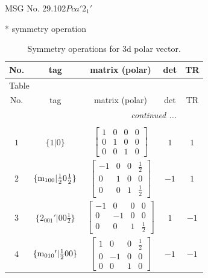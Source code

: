 \documentclass[fleqn,8pt]{jsarticle}
\begin{document}
\setcounter{MaxMatrixCols}{32}

\renewcommand{\tablename}{Table~}
\renewcommand{\figurename}{Figure~}
\begin{center}
\LARGE
MSG No. 29.102\quad$Pca'2_{1}'$
\end{center}
* symmetry operation
\renewcommand{\arraystretch}{1.3}
\begin{longtable}{ccccc}
\caption{Symmetry operations for 3d polar vector.}
 \\
 \hline \hline
No. & tag & matrix (polar) & det & TR \\ \hline \endfirsthead

\multicolumn{4}{l}{\tablename\ \thetable{}} \\
 \hline \hline
No. & tag & matrix (polar) & det & TR \\ \hline \endhead

 \hline \hline
\multicolumn{4}{r}{\footnotesize\it continued ...} \\ \endfoot

 \hline \hline
\multicolumn{4}{r}{} \\ \endlastfoot

$ 1 $ & $ \{1|0\} $ & $ \begin{bmatrix} 1 & 0 & 0 & 0 \\ 0 & 1 & 0 & 0 \\ 0 & 0 & 1 & 0 \end{bmatrix} $ & $ 1 $ & $ 1 $ \\ \hline
$ 2 $ & $ \{{\rm m}_{100}|\frac{1}{2} 0 \frac{1}{2}\} $ & $ \begin{bmatrix} -1 & 0 & 0 & \frac{1}{2} \\ 0 & 1 & 0 & 0 \\ 0 & 0 & 1 & \frac{1}{2} \end{bmatrix} $ & $ -1 $ & $ 1 $ \\ \hline
$ 3 $ & $ \{2{}_{001}{}'|0 0 \frac{1}{2}\} $ & $ \begin{bmatrix} -1 & 0 & 0 & 0 \\ 0 & -1 & 0 & 0 \\ 0 & 0 & 1 & \frac{1}{2} \end{bmatrix} $ & $ 1 $ & $ -1 $ \\ \hline
$ 4 $ & $ \{{\rm m}_{010}{}'|\frac{1}{2} 0 0\} $ & $ \begin{bmatrix} 1 & 0 & 0 & \frac{1}{2} \\ 0 & -1 & 0 & 0 \\ 0 & 0 & 1 & 0 \end{bmatrix} $ & $ -1 $ & $ -1 $ \\
\end{longtable}
\end{document}

